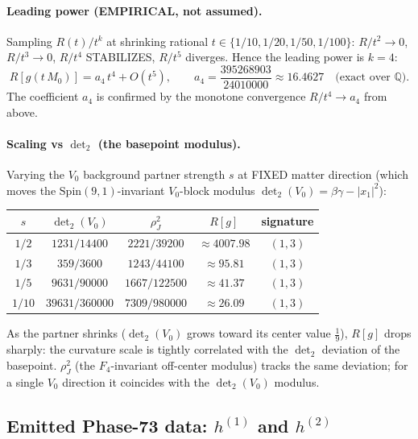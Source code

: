 \paragraph{Leading power (EMPIRICAL, not assumed).} Sampling $R(t)/t^k$ at shrinking
rational $t\in\{1/10,1/20,1/50,1/100\}$: $R/t^2\to0$, $R/t^3\to0$, $R/t^4$ STABILIZES,
$R/t^5$ diverges. Hence the leading power is $k=4$:
\begin{equation}
  R[g(t\,M_0)] = a_4\,t^4 + O(t^5),\qquad
  a_4 = \frac{395268903}{24010000} \approx 16.4627 \quad\text{(exact over }\mathbb{Q}).
\end{equation}
The coefficient $a_4$ is confirmed by the monotone convergence $R/t^4\to a_4$ from above.

\paragraph{Scaling vs $\det_2$ (the basepoint modulus).} Varying the $V_0$ background
partner strength $s$ at FIXED matter direction (which moves the
$\mathrm{Spin}(9,1)$-invariant $V_0$-block modulus $\det_2(V_0)=\beta\gamma-|x_1|^2$):
\begin{center}
\begin{tabular}{ccccc}
\hline
$s$ & $\det_2(V_0)$ & $\rho_J^2$ & $R[g]$ & signature \\
\hline
$1/2$  & $1231/14400$   & $2221/39200$  & $\approx4007.98$ & $(1,3)$ \\
$1/3$  & $359/3600$     & $1243/44100$  & $\approx95.81$   & $(1,3)$ \\
$1/5$  & $9631/90000$   & $1667/122500$ & $\approx41.37$   & $(1,3)$ \\
$1/10$ & $39631/360000$ & $7309/980000$ & $\approx26.09$   & $(1,3)$ \\
\hline
\end{tabular}
\end{center}
As the partner shrinks ($\det_2(V_0)$ grows toward its center value $\tfrac19$), $R[g]$
drops sharply: the curvature scale is tightly correlated with the $\det_2$ deviation of
the basepoint. $\rho_J^2$ (the $F_4$-invariant off-center modulus) tracks the same
deviation; for a single $V_0$ direction it coincides with the $\det_2(V_0)$ modulus.

\subsection{Emitted Phase-73 data: $h^{(1)}$ and $h^{(2)}$}
\label{sec:emit-h1}

